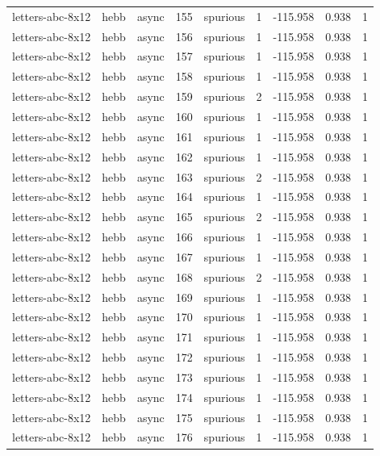 \begin{tabular}{lllrlrrrr}
letters-abc-8x12 & hebb & async & 155 & spurious & 1 & -115.958 & 0.938 & 1 \\
letters-abc-8x12 & hebb & async & 156 & spurious & 1 & -115.958 & 0.938 & 1 \\
letters-abc-8x12 & hebb & async & 157 & spurious & 1 & -115.958 & 0.938 & 1 \\
letters-abc-8x12 & hebb & async & 158 & spurious & 1 & -115.958 & 0.938 & 1 \\
letters-abc-8x12 & hebb & async & 159 & spurious & 2 & -115.958 & 0.938 & 1 \\
letters-abc-8x12 & hebb & async & 160 & spurious & 1 & -115.958 & 0.938 & 1 \\
letters-abc-8x12 & hebb & async & 161 & spurious & 1 & -115.958 & 0.938 & 1 \\
letters-abc-8x12 & hebb & async & 162 & spurious & 1 & -115.958 & 0.938 & 1 \\
letters-abc-8x12 & hebb & async & 163 & spurious & 2 & -115.958 & 0.938 & 1 \\
letters-abc-8x12 & hebb & async & 164 & spurious & 1 & -115.958 & 0.938 & 1 \\
letters-abc-8x12 & hebb & async & 165 & spurious & 2 & -115.958 & 0.938 & 1 \\
letters-abc-8x12 & hebb & async & 166 & spurious & 1 & -115.958 & 0.938 & 1 \\
letters-abc-8x12 & hebb & async & 167 & spurious & 1 & -115.958 & 0.938 & 1 \\
letters-abc-8x12 & hebb & async & 168 & spurious & 2 & -115.958 & 0.938 & 1 \\
letters-abc-8x12 & hebb & async & 169 & spurious & 1 & -115.958 & 0.938 & 1 \\
letters-abc-8x12 & hebb & async & 170 & spurious & 1 & -115.958 & 0.938 & 1 \\
letters-abc-8x12 & hebb & async & 171 & spurious & 1 & -115.958 & 0.938 & 1 \\
letters-abc-8x12 & hebb & async & 172 & spurious & 1 & -115.958 & 0.938 & 1 \\
letters-abc-8x12 & hebb & async & 173 & spurious & 1 & -115.958 & 0.938 & 1 \\
letters-abc-8x12 & hebb & async & 174 & spurious & 1 & -115.958 & 0.938 & 1 \\
letters-abc-8x12 & hebb & async & 175 & spurious & 1 & -115.958 & 0.938 & 1 \\
letters-abc-8x12 & hebb & async & 176 & spurious & 1 & -115.958 & 0.938 & 1 \\

\end{tabular}
